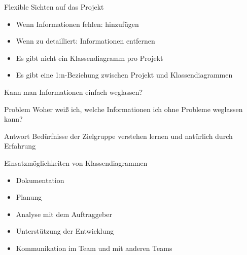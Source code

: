 \begin{frame}{Flexible Sichten auf das Projekt}
	\begin{itemize}
		\item Wenn Informationen fehlen: hinzufügen
        \item Wenn zu detailliert: Informationen entfernen
        \item Es gibt nicht ein Klassendiagramm pro Projekt
        \item Es gibt eine 1:n-Beziehung zwischen Projekt und Klassendiagrammen
	\end{itemize}
\end{frame}

\begin{frame}{Kann man Informationen einfach weglassen?}
    \begin{alertblock}{Problem}
        Woher weiß ich, welche Informationen ich ohne Probleme weglassen kann?
    \end{alertblock}
	\begin{exampleblock}{Antwort}
	    Bedürfnisse der Zielgruppe verstehen lernen und natürlich durch Erfahrung
	\end{exampleblock}
\end{frame}

\begin{frame}{Einsatzmöglichkeiten von Klassendiagrammen}
	\begin{itemize}
		\item Dokumentation
        \item Planung
        \item Analyse mit dem Auftraggeber
		\item Unterstützung der Entwicklung
		\item Kommunikation im Team und mit anderen Teams
	\end{itemize}
\end{frame}


